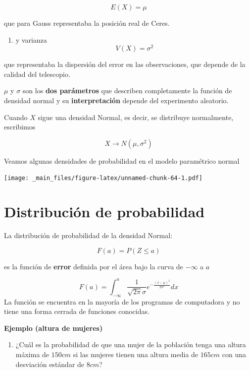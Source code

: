 \documentclass[
]{book}
\providecommand{\tightlist}{%
  \setlength{\itemsep}{0pt}\setlength{\parskip}{0pt}}
\begin{document}
\[E(X) = \mu\]

que para Gauss representaba la posición real de Ceres.

\begin{enumerate}
\def\labelenumi{\arabic{enumi})}
\setcounter{enumi}{1}
\tightlist
\item
  y varianza
  \[V (X) = \sigma^2\]
\end{enumerate}

que representaba la dispersión del error en las observaciones, que depende de la calidad del telescopio.

\(\mu\) y \(\sigma\) son los \textbf{dos parámetros} que describen completamente la función de densidad normal y su \textbf{interpretación} depende del experimento aleatorio.

Cuando \(X\) sigue una densidad Normal, es decir, se distribuye normalmente, escribimos

\[X\rightarrow N(\mu,\sigma^2)\]

Veamos algunas densidades de probabilidad en el modelo paramétrico normal

\texttt{[image: \_main\_files/figure-latex/unnamed-chunk-64-1.pdf]}

\hypertarget{distribuciuxf3n-de-probabilidad-2}{%
\section{Distribución de probabilidad}\label{distribuciuxf3n-de-probabilidad-2}}

La distribución de probabilidad de la densidad Normal:

\[F(a)=P(Z \leq a)\]

es la función de \textbf{error} definida por el área bajo la curva de \(-\infty\) a \(a\)

\[F(a)=\int_{-\infty}^{a}\frac{1}{\sqrt{2\pi}\sigma}e^{-\frac{(x-\mu) ^2}{2\sigma^2}} dx\]
La función se encuentra en la mayoría de los programas de computadora y no tiene una forma cerrada de funciones conocidas.

\textbf{Ejemplo (altura de mujeres)}

\begin{enumerate}
\def\labelenumi{\arabic{enumi})}
\tightlist
\item
  ¿Cuál es la probabilidad de que una mujer de la población tenga una altura máxima de \(150 cm\) si las mujeres tienen una altura media de \(165 cm\) con una desviación estándar de \(8 cm\)?
\end{enumerate}
\end{document}
